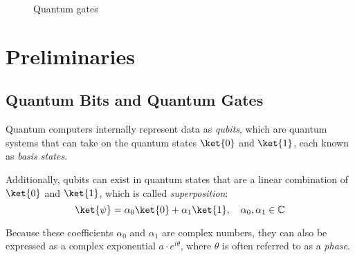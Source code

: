 \begin{figure}[t]
  \hspace{-0.5cm}
  \begin{minipage}{0.45\linewidth}
    \centering
    \scalebox{1.0} {
      
    }
    \scalebox{1.0} {
      
    }
    \scalebox{1.0}{
      
    }
    \scalebox{1.0} {
      
    }
  \end{minipage}
  \begin{minipage}{0.45\linewidth}
  \centering
    \scalebox{1.0} {
      
    }
    \scalebox{1.0} {
      
    }
    \scalebox{1.0} {
      
    }
    \scalebox{1.0} {
      
    }
  \end{minipage}
  \hspace{-0.5cm}
  \caption{Quantum gates}
  \label{fig-gates}
  \vspace{-0.5cm}
\end{figure}


\section{Preliminaries}
\label{Pre}
\subsection{Quantum Bits and Quantum Gates}
\label{Chap:Pre-qubits}
Quantum computers internally represent data as \emph{qubits}, which are quantum systems that can
take on the quantum states $\ket{0}$ and $\ket{1}$, each known as \emph{basis states}.

Additionally, qubits can exist in quantum states that are a linear combination of $\ket{0}$ and $\ket{1}$,
which is called \emph{superposition}:
\begin{equation}
\ket{\psi} = \alpha_0 \ket{0} + \alpha_1 \ket{1}, \quad \alpha_0, \alpha_1 \in \mathbb{C}
\end{equation}

Because these coefficients $\alpha_0$ and $\alpha_1$ are complex numbers, they can also be expressed as a complex exponential $a\cdot e^{i \theta}$, where $\theta$ is often referred to as a \emph{phase}.

